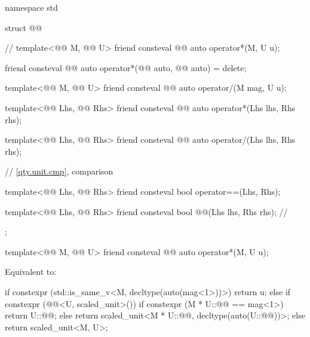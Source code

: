 \begin{codeblock}
namespace std {

struct @@ {  // \expos
  template<@@ M, @@ U>
  friend consteval @@ auto operator*(M, U u);

  friend consteval @@ auto operator*(@@ auto, @@ auto) = delete;

  template<@@ M, @@ U>
  friend consteval @@ auto operator/(M mag, U u);

  template<@@ Lhs, @@ Rhs>
  friend consteval @@ auto operator*(Lhs lhs, Rhs rhs);

  template<@@ Lhs, @@ Rhs>
  friend consteval @@ auto operator/(Lhs lhs, Rhs rhs);

  // \ref{qty.unit.cmp}, comparison

  template<@@ Lhs, @@ Rhs>
  friend consteval bool operator==(Lhs, Rhs);

  template<@@ Lhs, @@ Rhs>
  friend consteval bool @@(Lhs lhs, Rhs rhs);  // \expos
};

}
\end{codeblock}

\begin{itemdecl}
template<@@ M, @@ U>
friend consteval @@ auto operator*(M, U u);
\end{itemdecl}

\begin{itemdescr}
\pnum
\effects
Equivalent to:
\begin{codeblock}
if constexpr (std::is_same_v<M, decltype(auto(mag<1>))>)
  return u;
else if constexpr (@@<U, scaled_unit>()) {
  if constexpr (M{} * U::@@ == mag<1>)
    return U::@@;
  else
    return scaled_unit<M{} * U::@@, decltype(auto(U::@@))>{};
} else
  return scaled_unit<M{}, U>{};
\end{codeblock}
\end{itemdescr}

